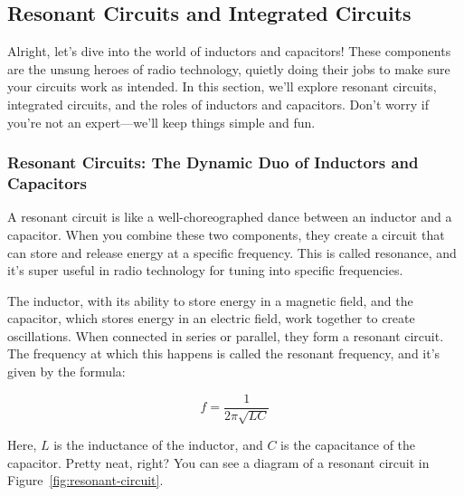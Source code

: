 \subsection{Resonant Circuits and Integrated Circuits}
\label{subsec:transformers-ind}

Alright, let’s dive into the world of inductors and capacitors! These components are the unsung heroes of radio technology, quietly doing their jobs to make sure your circuits work as intended. In this section, we’ll explore resonant circuits, integrated circuits, and the roles of inductors and capacitors. Don’t worry if you’re not an expert—we’ll keep things simple and fun.

\subsubsection*{Resonant Circuits: The Dynamic Duo of Inductors and Capacitors}

A resonant circuit is like a well-choreographed dance between an inductor and a capacitor. When you combine these two components, they create a circuit that can store and release energy at a specific frequency. This is called resonance, and it’s super useful in radio technology for tuning into specific frequencies.

The inductor, with its ability to store energy in a magnetic field, and the capacitor, which stores energy in an electric field, work together to create oscillations. When connected in series or parallel, they form a resonant circuit. The frequency at which this happens is called the resonant frequency, and it’s given by the formula:

\begin{equation}
f = \frac{1}{2\pi\sqrt{LC}}
\label{eq:resonant-frequency}
\end{equation}

Here, \( L \) is the inductance of the inductor, and \( C \) is the capacitance of the capacitor. Pretty neat, right? You can see a diagram of a resonant circuit in Figure~\ref{fig:resonant-circuit}.

